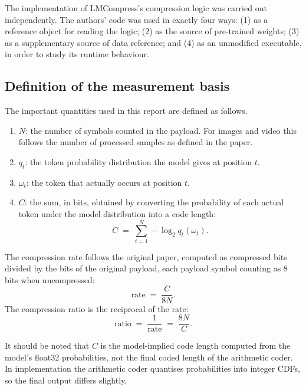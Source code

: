 \documentclass[12pt,a4paper]{article}
\newcommand{\qt}{q_t}
\newcommand{\wt}{\omega_t}
\begin{document}
The implementation of LMCompress's compression logic was carried out independently. The
authors' code was used in exactly four ways: (1) as a reference object for reading the
logic; (2) as the source of pre-trained weights; (3) as a supplementary source of data
reference; and (4) as an unmodified executable, in order to study its runtime behaviour.

\subsection{Definition of the measurement basis}

The important quantities used in this report are defined as follows.

\begin{enumerate}[label=\arabic*.,leftmargin=*]
  \item $N$: the number of symbols counted in the payload. For images and video this follows
        the number of processed samples as defined in the paper.
  \item $\qt$: the token probability distribution the model gives at position $t$.
  \item $\wt$: the token that actually occurs at position $t$.
  \item $C$: the sum, in bits, obtained by converting the probability of each actual token
        under the model distribution into a code length:
        \begin{equation}
          C \;=\; \sum_{t=1}^{N} -\log_2 \qt(\wt).
        \end{equation}
\end{enumerate}

The compression rate follows the original paper, computed as compressed bits divided by the
bits of the original payload, each payload symbol counting as 8 bits when uncompressed:
\begin{equation}
  \text{rate} \;=\; \frac{C}{8N}.
\end{equation}
The compression ratio is the reciprocal of the rate:
\begin{equation}
  \text{ratio} \;=\; \frac{1}{\text{rate}} \;=\; \frac{8N}{C}.
\end{equation}

It should be noted that $C$ is the model-implied code length computed from the model's
float32 probabilities, not the final coded length of the arithmetic coder. In
implementation the arithmetic coder quantises probabilities into integer CDFs, so the final
output differs slightly.
\end{document}
